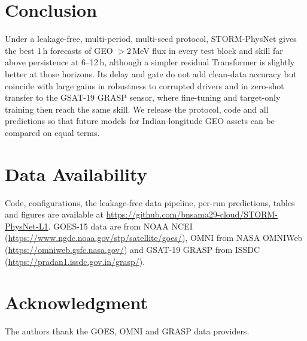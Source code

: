 \documentclass[conference,a4paper]{IEEEtran}
\begin{document}
\section{Conclusion}
Under a leakage-free, multi-period, multi-seed protocol, STORM-PhysNet gives
the best 1\,h forecasts of GEO \({>}2\)\,MeV flux in every test block and
skill far above persistence at 6--12\,h, although a simpler residual
Transformer is slightly better at those horizons. Its delay and gate do not add
clean-data accuracy but coincide with large gains in robustness to corrupted
drivers and in zero-shot transfer to the GSAT-19 GRASP sensor, where fine-tuning
and target-only training then reach the same skill. We release the protocol,
code and all predictions so that future models for Indian-longitude GEO assets
can be compared on equal terms.

\section*{Data Availability}
Code, configurations, the leakage-free data pipeline, per-run predictions,
tables and figures are available at
\url{https://github.com/bnsama29-cloud/STORM-PhysNet-L1}. GOES-15 data are
from NOAA NCEI (\url{https://www.ngdc.noaa.gov/stp/satellite/goes/}), OMNI from
NASA OMNIWeb (\url{https://omniweb.gsfc.nasa.gov/}) and GSAT-19 GRASP from ISSDC
(\url{https://pradan1.issdc.gov.in/grasp/}).

\section*{Acknowledgment}
The authors thank the GOES, OMNI and GRASP data providers.
\end{document}
